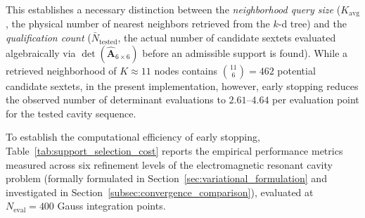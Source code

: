 \documentclass[preprint,12pt]{elsarticle}
\begin{document}
This establishes a necessary distinction between the \emph{neighborhood query size} ($K_{\mathrm{avg}}$, the physical number of nearest neighbors retrieved from the $k$-d tree) and the \emph{qualification count} ($\bar{N}_{\mathrm{tested}}$, the actual number of candidate sextets evaluated algebraically via $\det(\widehat{\mathbf{A}}_{6\times6})$ before an admissible support is found). While a retrieved neighborhood of $K \approx 11$ nodes contains $\binom{11}{6} = 462$ potential candidate sextets, in the present implementation, however, early stopping reduces the observed number of determinant evaluations to $2.61\text{--}4.64$ per evaluation point for the tested cavity sequence.

To establish the computational efficiency of early stopping, Table~\ref{tab:support_selection_cost} reports the empirical performance metrics measured across six refinement levels of the electromagnetic resonant cavity problem (formally formulated in Section~\ref{sec:variational_formulation} and investigated in Section~\ref{subsec:convergence_comparison}), evaluated at $N_{\mathrm{eval}} = 400$ Gauss integration points.

\begin{table}[!htbp]
\centering
\caption{Computational cost of automated support selection across six cavity discretization levels ($N_{\mathrm{eval}} = 400$ Gauss evaluation points, $K_{\mathrm{initial}} = 12$).}
\label{tab:support_selection_cost}
\end{table}
\end{document}

